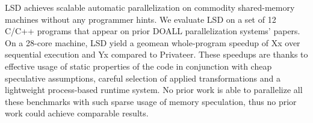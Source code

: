 LSD achieves scalable automatic parallelization on commodity shared-memory
machines without any programmer hints.  We evaluate LSD on a set of 12 C/C++
programs that appear on prior DOALL parallelization systems' papers. On a
28-core machine, LSD yield a geomean whole-program speedup of Xx over sequential
execution and Yx compared to Privateer.
These speedups are thanks to effective usage of static properties of the code in
conjunction with cheap speculative assumptions, careful selection of applied
transformations and a lightweight process-based runtime system.  No prior work
is able to parallelize all these benchmarks with such sparse usage of memory
speculation, thus no prior work could achieve comparable results.

